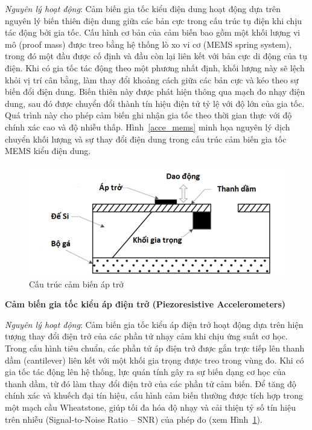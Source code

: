\textit{Nguyên lý hoạt động}: Cảm biến gia tốc kiểu điện dung hoạt động dựa trên nguyên lý biến thiên điện dung giữa các bản cực trong cấu trúc tụ điện khi chịu tác động bởi gia tốc. Cấu hình cơ bản của cảm biến bao gồm một khối lượng vi mô (proof mass) được treo bằng hệ thống lò xo vi cơ (MEMS spring system), trong đó một đầu được cố định và đầu còn lại liên kết với bản cực di động của tụ điện. Khi có gia tốc tác động theo một phương nhất định, khối lượng này sẽ lệch khỏi vị trí cân bằng, làm thay đổi khoảng cách giữa các bản cực và kéo theo sự biến đổi điện dung. Biến thiên này được phát hiện thông qua mạch đo nhạy điện dung, sau đó được chuyển đổi thành tín hiệu điện tử tỷ lệ với độ lớn của gia tốc. 
Quá trình này cho phép cảm biến ghi nhận gia tốc theo thời gian 
thực với độ chính xác cao và độ nhiễu thấp. Hình~\ref{acce_mems} minh họa nguyên lý dịch chuyển khối lượng và sự thay đổi điện dung trong cấu trúc cảm biến gia tốc MEMS kiểu điện dung.


\begin{figure} [!]
		\centering
 		\includegraphics[width=\textwidth]{images/acce_aptro.png}
 		\vspace*{-7mm}
		\caption{Cấu trúc cảm biến áp trở}
		\label{acce_aptro}
  \FloatBarrier
\end{figure}

\textbf{Cảm biến gia tốc kiểu áp điện trở (Piezoresistive Accelerometers)}

\textit{Nguyên lý hoạt động}: Cảm biến gia tốc kiểu áp điện trở hoạt động dựa trên hiện tượng thay đổi điện trở của các phần tử nhạy cảm khi chịu ứng suất cơ học. Trong cấu hình tiêu chuẩn, các phần tử áp điện trở được gắn trực tiếp lên thanh dầm (cantilever) liên kết với một khối gia trọng được treo trong vùng đo. Khi có gia tốc tác động lên hệ thống, lực quán tính gây ra sự biến dạng cơ học của thanh dầm, từ đó làm thay đổi điện trở của các phần tử cảm biến. Để tăng độ chính xác và khuếch đại tín hiệu, cấu hình cảm biến thường được tích hợp trong một mạch cầu Wheatstone, giúp tối đa hóa độ nhạy và cải thiện tỷ số tín hiệu trên nhiễu (Signal-to-Noise Ratio – SNR) của phép đo (xem Hình~\ref{acce_aptro}).

